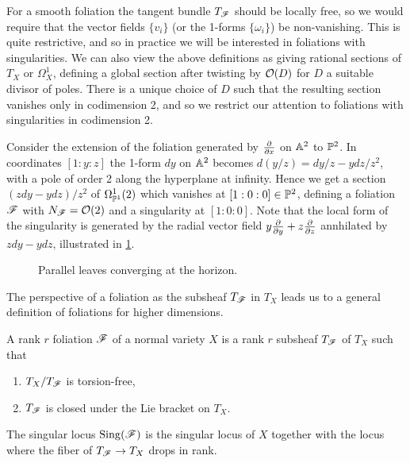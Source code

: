 For a smooth foliation the tangent bundle $T_\scrF$ should be locally free, so
we would require that the vector fields $\{v_i\}$ (or the 1-forms
$\{\omega_i\}$) be non-vanishing. This is quite restrictive, and so in practice
we will be interested in foliations with singularities. We can also view the
above definitions as giving rational sections of $T_X$ or $\Omega^1_X$, defining
a global section after twisting by $\O(D)$ for $D$ a suitable divisor of poles.
There is a unique choice of $D$ such that the resulting section vanishes only in
codimension 2, and so we restrict our attention to foliations with singularities
in codimension 2.

\begin{example}\label{ex:parallel}
    Consider the extension of the foliation generated by $\pdv{}{x}$ on $\A^2$
    to $\P^2$. In coordinates $[1:y:z]$ the 1-form $dy$ on $\A^2$ becomes
    $d(y/z)=dy/z-ydz/z^2$, with a pole of order 2 along the hyperplane at
    infinity. Hence we get a section $(zdy-ydz)/z^2$ of $\Omega^1_{\P^1}(2)$
    which vanishes at $[1:0:0]\in\P^2$, defining a foliation $\scrF$ with
    $N_\scrF=\O(2)$ and a singularity at $[1:0:0]$. Note that the local form of
    the singularity is generated by the radial vector field
    $y\pdv{}{y}+z\pdv{}{z}$ annhilated by $zdy-ydz$, illustrated in
    \cref{fig:parallel}.
    \begin{figure}[H]
        \centering
        \caption{Parallel leaves converging at the horizon.}
        \label{fig:parallel}
    \end{figure}
\end{example}

The perspective of a foliation as the subsheaf $T_\scrF$ in $T_X$ leads us to a
general definition of foliations for higher dimensions.

\begin{definition}\label{defn:foliation}
    A rank $r$ foliation $\scrF$ of a normal variety $X$ is a rank $r$ subsheaf
    $T_\scrF$ of $T_X$ such that
    \begin{enumerate}[label=\roman*.]
        \item $T_X/T_\scrF$ is torsion-free,
        \item $T_\scrF$ is closed under the Lie bracket on $T_X$.
    \end{enumerate}
    The singular locus $\Sing(\scrF)$ is the singular locus of $X$ together with
    the locus where the fiber of $T_\scrF\to T_X$ drops in rank.
\end{definition}

